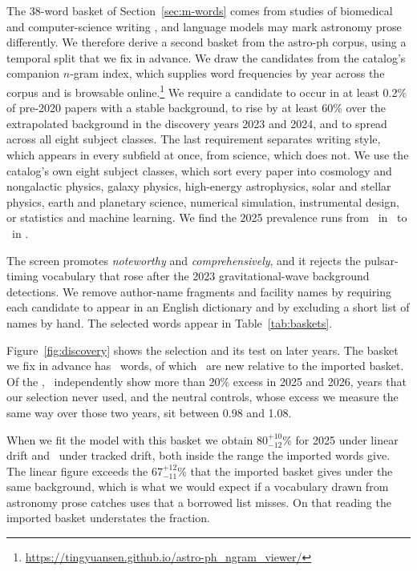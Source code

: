 \documentclass[twocolumn]{aastex631}
\begin{document}
The 38-word basket of Section~\ref{sec:m-words} comes from studies of biomedical and computer-science writing \citep{Liang2024, Kobak2024, Gray2025}, and language models may mark astronomy prose differently. We therefore derive a second basket from the astro-ph corpus, using a temporal split that we fix in advance. We draw the candidates from the catalog's companion $n$-gram index, which supplies word frequencies by year across the corpus and is browsable online.\footnote{\url{https://tingyuansen.github.io/astro-ph_ngram_viewer/}} We require a candidate to occur in at least 0.2\% of pre-2020 papers with a stable background, to rise by at least 60\% over the extrapolated background in the discovery years 2023 and 2024, and to spread across all eight subject classes. The last requirement separates writing style, which appears in every subfield at once, from science, which does not. We use the catalog's own eight subject classes, which sort every paper into cosmology and nongalactic physics, galaxy physics, high-energy astrophysics, solar and stellar physics, earth and planetary science, numerical simulation, instrumental design, or statistics and machine learning. We find the 2025 prevalence runs from \piBottomClass\ in \bottomTopicName\ to \piTopClass\ in \topTopicName.

The screen promotes \textit{noteworthy} and \textit{comprehensively}, and it rejects the pulsar-timing vocabulary that rose after the 2023 gravitational-wave background detections. We remove author-name fragments and facility names by requiring each candidate to appear in an English dictionary and by excluding a short list of names by hand. The selected words appear in Table~\ref{tab:baskets}.

Figure~\ref{fig:discovery} shows the selection and its test on later years. The basket we fix in advance has \nExpandedWords\ words, of which \nExpandedNew\ are new relative to the imported basket. Of the \nExpandedWords, \nExpandedHeld\ independently show more than 20\% excess in 2025 and 2026, years that our selection never used, and the neutral controls, whose excess we measure the same way over those two years, sit between 0.98 and 1.08.

When we fit the model with this basket we obtain $80^{+10}_{-12}$\% for 2025 under linear drift and \piExpandedTracked\ under tracked drift, both inside the range the imported words give. The linear figure exceeds the $67^{+12}_{-11}$\% that the imported basket gives under the same background, which is what we would expect if a vocabulary drawn from astronomy prose catches uses that a borrowed list misses. On that reading the imported basket understates the fraction.
\end{document}
